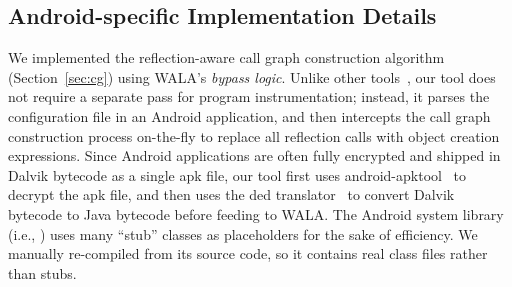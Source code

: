 \subsection{Android-specific Implementation Details}


We implemented the reflection-aware call graph construction
 algorithm (Section~\ref{sec:cg}) using WALA's \textit{bypass logic}.
Unlike other tools~\cite{Payet:2011:SAA:2032266.2032299}, our tool
does not require a separate pass for program instrumentation; instead, it
parses the configuration file in an Android application,
and then intercepts the call graph construction
process on-the-fly to replace all reflection calls with object creation expressions.
Since Android applications are often fully encrypted and shipped in Dalvik
bytecode as a single apk file, our tool first uses
android-apktool~\cite{apktool} to
decrypt the apk file, and then uses the 
ded translator~\cite{ded} to convert
Dalvik bytecode to Java bytecode before feeding to WALA\@.  The Android system
library (i.e., ) uses many ``stub'' classes as
placeholders for the sake of efficiency. We manually re-compiled 
 from its source code, so it contains real
class files rather than stubs.



